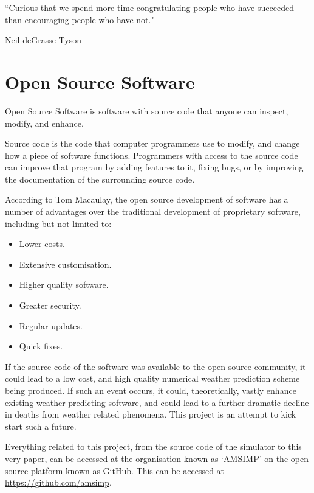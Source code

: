 \epigraph{``Curious that we spend more time congratulating people who have succeeded than encouraging people who have not."}{Neil deGrasse Tyson}

\section{Open Source Software}
\begin{definition}
Open Source Software is software with source code that anyone can inspect, modify, and enhance. 
\end{definition}

Source code is the code that computer programmers use to modify, and change how a piece of software functions\cite{what_oss}. Programmers with access to the source code can improve that program by adding features to it, fixing bugs, or by improving the documentation of the surrounding source code. 

According to Tom Macaulay\cite{advantages}, the open source development of software has a number of advantages over the traditional development of proprietary software, including but not limited to:

\begin{itemize}
    \item Lower costs.
    \item Extensive customisation.
    \item Higher quality software.
    \item Greater security.
    \item Regular updates.
    \item Quick fixes.
\end{itemize}

If the source code of the software was available to the open source community, it could lead to a low cost, and high quality numerical weather prediction scheme being produced. If such an event occurs, it could, theoretically, vastly enhance existing weather predicting software, and could lead to a further dramatic decline in deaths from weather related phenomena. This project is an attempt to kick start such a future.

Everything related to this project, from the source code of the simulator to this very paper, can be accessed at the organisation known as `AMSIMP' on the open source platform known as GitHub. This can be accessed at \url{https://github.com/amsimp}. 

